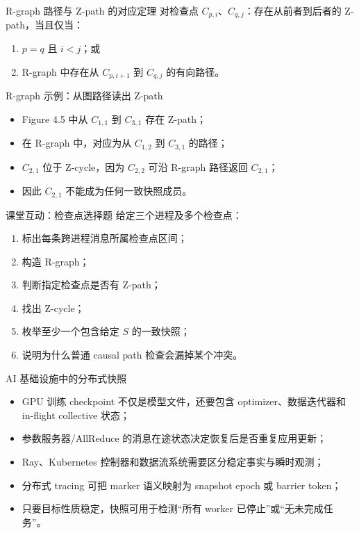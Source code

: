 \documentclass[UTF8,fontset=none,aspectratio=169,10pt]{beamer}
\begin{document}
\begin{frame}{R-graph 路径与 Z-path 的对应定理}
对检查点 $C_{p,i}$、$C_{q,j}$：存在从前者到后者的 Z-path，当且仅当：
\begin{enumerate}
  \item $p=q$ 且 $i<j$；或
  \item R-graph 中存在从 $C_{p,i+1}$ 到 $C_{q,j}$ 的有向路径。
\end{enumerate}
\vfill
{}
\end{frame}

\begin{frame}{R-graph 示例：从图路径读出 Z-path}
\begin{itemize}
  \item Figure 4.5 中从 $C_{1,1}$ 到 $C_{3,1}$ 存在 Z-path；
  \item 在 R-graph 中，对应为从 $C_{1,2}$ 到 $C_{3,1}$ 的路径；
  \item $C_{2,1}$ 位于 Z-cycle，因为 $C_{2,2}$ 可沿 R-graph 路径返回 $C_{2,1}$；
  \item 因此 $C_{2,1}$ 不能成为任何一致快照成员。
\end{itemize}
\end{frame}

\begin{frame}{课堂互动：检查点选择题}
给定三个进程及多个检查点：
\begin{enumerate}
  \item 标出每条跨进程消息所属检查点区间；
  \item 构造 R-graph；
  \item 判断指定检查点是否有 Z-path；
  \item 找出 Z-cycle；
  \item 枚举至少一个包含给定 $S$ 的一致快照；
  \item 说明为什么普通 causal path 检查会漏掉某个冲突。
\end{enumerate}
\end{frame}

\begin{frame}{AI 基础设施中的分布式快照}
\begin{itemize}
  \item GPU 训练 checkpoint 不仅是模型文件，还要包含 optimizer、数据迭代器和 in-flight collective 状态；
  \item 参数服务器/AllReduce 的消息在途状态决定恢复后是否重复应用更新；
  \item Ray、Kubernetes 控制器和数据流系统需要区分稳定事实与瞬时观测；
  \item 分布式 tracing 可把 marker 语义映射为 snapshot epoch 或 barrier token；
  \item 只要目标性质稳定，快照可用于检测“所有 worker 已停止”或“无未完成任务”。
\end{itemize}
\end{frame}
\end{document}

